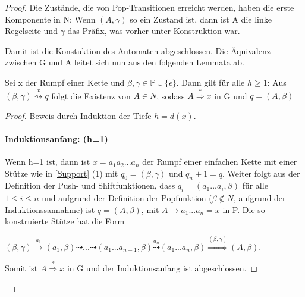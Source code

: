 \begin{proof}
Die Zustände, die von Pop-Transitionen erreicht werden, haben die erste Komponente in N: Wenn $(A, \gamma)$ so ein Zustand ist, dann ist A die linke Regelseite und $\gamma$ das Präfix, was vorher unter Konstruktion war.

Damit ist die Konstuktion des Automaten abgeschlossen. Die Äquivalenz zwischen G und A leitet sich nun aus den folgenden Lemmata ab.
\begin{lemma}
Sei x der Rumpf einer Kette und $\beta, \gamma \in \mathbb{P \cup \{ \epsilon\} }$. Dann gilt für alle $h \geq 1$: Aus $(\beta, \gamma) \stackrel{x}{\rightsquigarrow} q$ folgt die Existenz von $A\in N$, sodass $A\stackrel{*}{\Rightarrow}x$ in G und $q=(A, \beta)$
\end{lemma}
\begin{proof}
Beweis durch Induktion der Tiefe $h=d(x)$.
\paragraph*{Induktionsanfang: (h=1)}
Wenn h=1 ist, dann ist $x=a_1a_2...a_n$ der Rumpf einer einfachen Kette mit einer Stütze wie in \autoref{Support} (1) mit $q_0 = (\beta, \gamma)$ und $q_n+1=q$. Weiter folgt aus der Definition der Push- und Shiftfunktionen, dass $q_i=(a_1...a_i, \beta)$ für alle $1 \leq i \leq n$ und aufgrund der Definition der Popfunktion ($\beta \notin N$, aufgrund der Induktionssannahme) ist $q=(A, \beta)$, mit $A \rightarrow a_1...a_n=x$ in P. Die so konstruierte Stütze hat die Form 
\begin{center}
$(\beta, \gamma) \stackrel{a_1}{\rightarrow} (a_1, \beta) \dashrightarrow ... \dashrightarrow (a_1...a_{n-1}, \beta) \stackrel{a_n}{\dashrightarrow} (a_1...a_n, \beta) \stackrel{(\beta, \gamma)} {\Rightarrow} (A,\beta)$.
\end{center}
Somit ist $A\stackrel{*}{\Rightarrow}x$ in G und der Induktionsanfang ist abgeschlossen.

\end{proof}
\end{proof}
